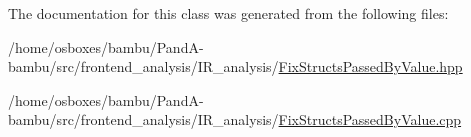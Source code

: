 The documentation for this class was generated from the following files\+:\begin{DoxyCompactItemize}
\item 
/home/osboxes/bambu/\+Pand\+A-\/bambu/src/frontend\+\_\+analysis/\+I\+R\+\_\+analysis/\hyperlink{FixStructsPassedByValue_8hpp}{Fix\+Structs\+Passed\+By\+Value.\+hpp}\item 
/home/osboxes/bambu/\+Pand\+A-\/bambu/src/frontend\+\_\+analysis/\+I\+R\+\_\+analysis/\hyperlink{FixStructsPassedByValue_8cpp}{Fix\+Structs\+Passed\+By\+Value.\+cpp}\end{DoxyCompactItemize}
